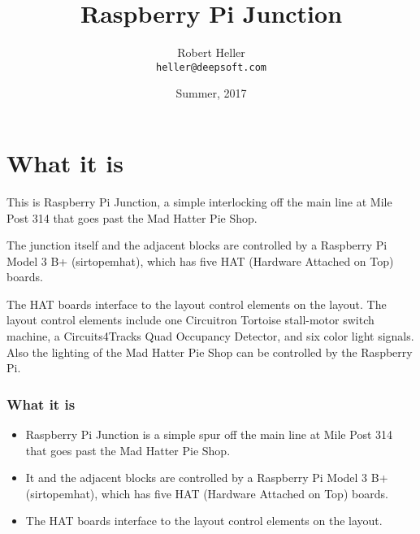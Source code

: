 \documentclass[letterpaper]{article} \usepackage{beamerarticle}
\title{Raspberry Pi Junction}
\author{Robert Heller \\ \texttt{heller@deepsoft.com}}
\institute{Deepwoods Software}
\date{Summer, 2017}
\begin{document}
\begin{frame}
  \titlepage
\end{frame}





\section{What it is}

This is Raspberry Pi Junction, a simple interlocking off the main line at Mile 
Post 314 that goes past the Mad Hatter Pie Shop.

The junction itself and the adjacent blocks are controlled by a Raspberry Pi 
Model 3 B+ (sirtopemhat), which has five HAT (Hardware Attached on Top) boards.

The HAT boards interface to the layout control elements on the layout. The
layout control elements include one Circuitron Tortoise stall-motor switch
machine, a Circuits4Tracks Quad Occupancy Detector, and six color light
signals.  Also the lighting of the Mad Hatter Pie Shop can be controlled by 
the Raspberry Pi.

\begin{frame}
   \frametitle{What it is}
   \begin{itemize}
   \item Raspberry Pi Junction is a simple spur off the main line at Mile Post 
   314 that goes past the Mad Hatter Pie Shop. 
   \item It and the adjacent blocks are controlled by a Raspberry Pi Model 3 
   B+ (sirtopemhat), which has five HAT (Hardware Attached on Top) boards.
   \item The HAT boards interface to the layout control elements on the 
   layout.
   \end{itemize}
\end{frame} 
\end{document}
